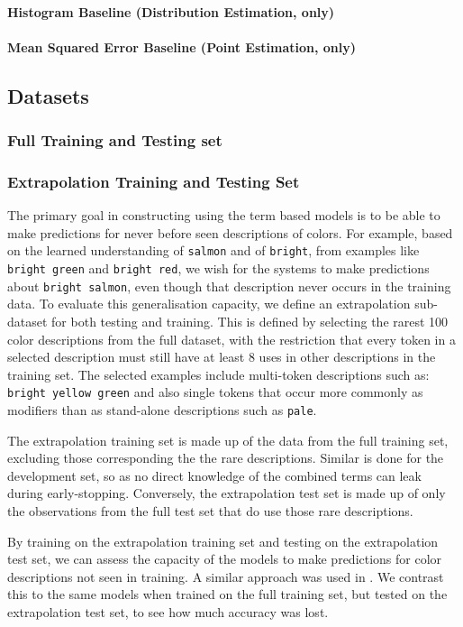 \documentclass[11pt,a4paper]{article}
\newcommand{\textcite}{\citet}
\begin{document}
\paragraph{Histogram Baseline (Distribution Estimation, only)}
\paragraph{Mean Squared Error Baseline (Point Estimation, only)}

\subsection{Datasets}


\subsubsection{Full Training and Testing set}
\subsubsection{Extrapolation Training and Testing Set}
The primary goal in constructing using the term based models is to be able to make predictions for never before seen descriptions of colors.
For example, based on the learned understanding of \texttt{salmon} and of \texttt{bright}, from examples like \texttt{bright green} and \texttt{bright red}, we wish for the systems to make predictions about \texttt{bright salmon}, even though that description never occurs in the training data.
%
To evaluate this generalisation capacity, we define an extrapolation sub-dataset for both testing and training.
This is defined by selecting the rarest 100 color descriptions from the full dataset,
with the restriction that every token in a selected description must still have at least 8 uses in other descriptions in the training set.
The selected examples include multi-token descriptions such as: \texttt{bright yellow green} and also single tokens that occur more commonly as modifiers than as stand-alone descriptions such as \texttt{pale}.

The extrapolation training set is made up of the data from the full training set, excluding those  corresponding the the rare descriptions.
Similar is done for the development set, so as no direct knowledge of the combined terms can leak during early-stopping.
Conversely, the extrapolation test set is made up of only the observations from the full test set that do use those rare descriptions.


By training on the extrapolation training set and testing on the extrapolation test set, we can assess the capacity of the models to make predictions for color descriptions not seen in training.
A similar approach was used in \textcite{DBLP:journals/corr/AtzmonBKGC16}.
We contrast this to the same models when trained on the full training set, but tested on the extrapolation test set, to see how much accuracy was lost.
\end{document}
